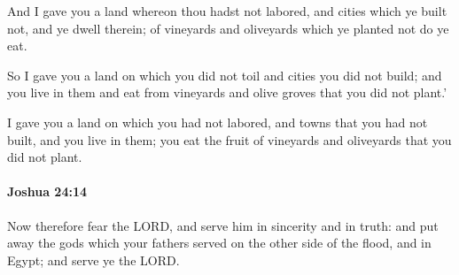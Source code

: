 			\begin{versebox}
					\item[BHS] 
					\item[ASV] And I gave you a land whereon thou hadst not labored, and cities which ye built not, and ye dwell therein; of vineyards and oliveyards which ye planted not do ye eat.
					\item[NIV] So I gave you a land on which you did not toil and cities you did not build; and you live in them and eat from vineyards and olive groves that you did not plant.’
					\item[NRSV] I gave you a land on which you had not labored, and towns that you had not built, and you live in them; you eat the fruit of vineyards and oliveyards that you did not plant.
			\end{versebox}

		\paragraph{Joshua 24:14} %
			\label{JOSHUA-24-14}

			Now therefore fear the LORD, and serve him in sincerity and in truth: and put away the gods which your fathers served on the other side of the flood, and in Egypt; and serve ye the LORD.

